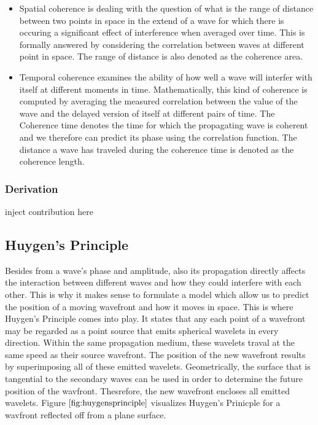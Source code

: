\begin{itemize}
  \item Spatial coherence is dealing with the question of what is the range of distance between two points in space in the extend of a wave for which there is occuring a significant effect of interference when averaged over time. This is formally answered by considering the correlation between waves at different point in space. The range of distance is also denoted as the coherence area.
  \item Temporal coherence examines the ability of how well a wave will interfer with itself at different moments in time. Mathematically, this kind of coherence is computed by averaging the measured correlation between the value of the wave and the delayed version of itself at different pairs of time. The Coherence time denotes the time for which the propagating wave is coherent and we therefore can predict its phase using the correlation function. The distance a wave has traveled during the coherence time is denoted as the coherence length.
\end{itemize}

\subsubsection{Derivation}
inject contribution here

\subsection{Huygen's Principle}
Besides from a wave's phase and amplitude, also its propagation directly affects the interaction between different waves and how they could interfere with each other. This is why it makes sense to formulate a model which allow us to predict the position of a moving wavefront and how it moves in space. This is where Huygen's Principle comes into play. It states that any each point of a wavefront may be regarded as a point source that emits spherical wavelets in every direction. Within the same propagation medium, these wavelets traval at the same speed as their source wavefront. The position of the new wavefront results by superimposing all of these emitted wavelets. Geometrically, the surface that is tangential to the secondary waves can be used in order to determine the future position of the wavfront. Thesrefore, the new wavefront encloses all emitted wavelets. Figure $\ref{fig:huygensprinciple}$ visualizes Huygen's Prinicple for a wavfront reflected off from a plane surface.

